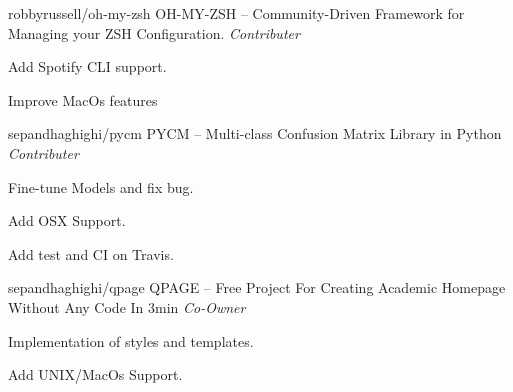 


\begin{cventries}
  \cventry
    {robbyrussell/oh-my-zsh} %
    {OH-MY-ZSH -- Community-Driven Framework for Managing your ZSH Configuration.} %
    {\textit{Contributer}} %
    {} %
    {
      \begin{cvitems} %
        \item {Add Spotify CLI support.}
        \item {Improve MacOs features}
      \end{cvitems}
    }
        \newline
  \cventry
    {sepandhaghighi/pycm} %
    {PYCM -- Multi-class Confusion Matrix Library in Python} %
    {\textit{Contributer}} %
    {} %
    {
      \begin{cvitems} %
        \item {Fine-tune Models and fix bug.}
        \item {Add OSX Support.}
        \item {Add test and CI on Travis.}
      \end{cvitems}
    }
        \newline
  \cventry
    {sepandhaghighi/qpage} %
    {QPAGE -- Free Project For Creating Academic Homepage Without Any Code In 3min} %
    {\textit{Co-Owner}} %
    {} %
    {
      \begin{cvitems} %
        \item {Implementation of styles and templates.}
        \item {Add UNIX/MacOs Support.}
      \end{cvitems}
    }



\end{cventries}
